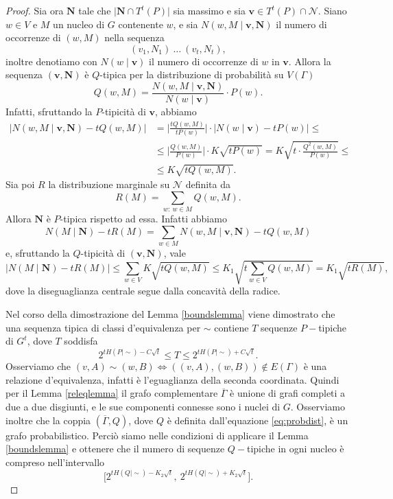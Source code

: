 \begin{proof}
  Sia ora \(\mathbf{N}\) tale che \(\big\vert \mathbf{N}\cap T^t(P) \big\vert\) sia massimo e sia \(\mathbf{v}\in T^t(P)\cap \mathcal{N}\). Siano \(w\in V\) e \(M\) un nucleo di \(G\) contenente \(w\), e sia \(N(w,M\mid \mathbf{v}, \mathbf{N})\) il numero di occorrenze di \((w,M)\) nella sequenza
  \[(v_1, N_1)\ \dots\ (v_t, N_t),\]
  inoltre denotiamo con \(N(w\mid \mathbf{v})\) il numero di occorrenze di \(w\) in \(\mathbf{v}\). Allora la sequenza \((\mathbf{v}, \mathbf{N})\) è \(Q\)-tipica per la distribuzione di probabilità su \(V(\Gamma)\) 
  \begin{equation}
    \label{eq:probdist} Q(w,M)=\frac{N(w,M\mid \mathbf{v}, \mathbf{N})}{N(w\mid \mathbf{v})}\cdot P(w). 
  \end{equation}
  Infatti, sfruttando la \(P\)-tipicità di \(\mathbf{v}\), abbiamo 
  \begin{align}
    \big\vert N(w,M\mid \mathbf{v}, \mathbf{N}) - tQ(w,M)\big\vert &= \bigg\vert \frac{tQ(w,M)}{tP(w)}\bigg\vert \cdot \big\vert N(w\mid \mathbf{v}) - tP(w)\big\vert \le \nonumber \\
    &\le \bigg\vert \frac{Q(w,M)}{P(w)}\bigg\vert \cdot K\sqrt{tP(w)} = K\sqrt{t\cdot\frac{Q^{2}(w,M)}{P(w)}} \le \nonumber \\
    &\le K\sqrt{tQ(w,M)}. \nonumber 
  \end{align}
  Sia poi \(R\) la distribuzione marginale su \(\mathcal{N}\) definita da
  \[R(M)=\sum_{w:\ w\in M} Q(w,M).\]
  Allora \(\mathbf{N}\) è \(P\)-tipica rispetto ad essa. Infatti abbiamo
  \[N(M\mid \mathbf{N})-tR(M)=\sum_{w\in M} N(w,M\mid \mathbf{v},\mathbf{N})-tQ(w,M)\]
  e, sfruttando la \(Q\)-tipicità di \((\mathbf{v}, \mathbf{N})\), vale
  \[\big\vert N(M\mid \mathbf{N})-tR(M) \big\vert\le \sum_{w\in V} K\sqrt{tQ(w,M)}\le K_{1}\sqrt{t\sum_{w\in V} Q(w,M)}=K_{1}\sqrt{tR(M)},\]
  dove la diseguaglianza centrale segue dalla concavità della radice.
  
  Nel corso della dimostrazione del Lemma \ref{boundslemma} viene dimostrato che una sequenza tipica di classi d'equivalenza per \(\sim\) contiene \(T\) sequenze \(P-\)tipiche di \(G^t\), dove \(T\) soddisfa
  \[2^{tH(P\mid\sim)-C\sqrt{t}}\le T\le 2^{tH(P\mid\sim)+C\sqrt{t}}.\]
  Osserviamo che \((v,A)\sim (w,B) \iff ((v,A),(w,B))\not\in E(\Gamma)\) è una relazione d'equivalenza, infatti è l'eguaglianza della seconda coordinata. Quindi per il Lemma \ref{releqlemma} il grafo complementare \(\overline{\Gamma}\) è unione di grafi completi a due a due disgiunti, e le sue componenti connesse sono i nuclei di \(G\). Osserviamo inoltre che la coppia \((\overline{\Gamma}, Q)\), dove \(Q\) è definita dall'equazione \eqref{eq:probdist}, è un grafo probabilistico. Perciò siamo nelle condizioni di applicare il Lemma \ref{boundslemma} e ottenere che il numero di sequenze \(Q-\)tipiche in ogni nucleo è compreso nell'intervallo 
  \begin{equation}
    \label{eq:bounds} \Big[2^{tH(Q\mid\sim)-K_{2}\sqrt{t}},\ 2^{tH(Q\mid\sim)+K_{2}\sqrt{t}}\Big]. 
  \end{equation}
  

\end{proof}
